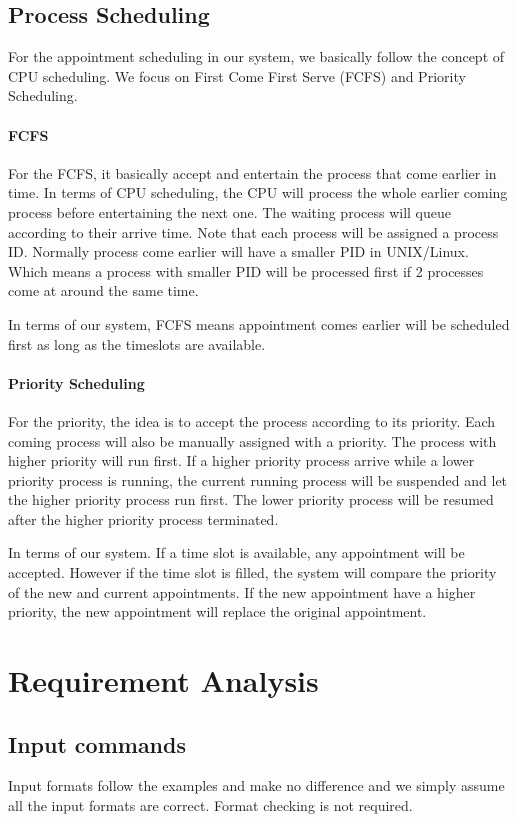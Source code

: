 \documentclass[12pt,a4paper]{report}
\begin{document}
\section{Process Scheduling}
For the appointment scheduling in our system, we basically follow the concept of CPU scheduling. We focus on First Come First Serve (FCFS) and Priority Scheduling.
\subsubsection{FCFS}
For the FCFS, it basically accept and entertain the process that come earlier in time. In terms of CPU scheduling, the CPU will process the whole earlier coming process before entertaining the next one. The waiting process will queue according to their arrive time. Note that each process will be assigned a process ID. Normally process come earlier will have a smaller PID in UNIX/Linux. Which means a process with smaller PID will be processed first if 2 processes come at around the same time.

In terms of our system, FCFS means appointment comes earlier will be scheduled first as long as the timeslots are available.
\subsubsection{Priority Scheduling}
For the priority, the idea is to accept the process according to its priority. Each coming process will also be manually assigned with a priority. The process with higher priority will run first. If a higher priority process arrive while a lower priority process is running, the current running process will be suspended and let the higher priority process run first. The lower priority process will be resumed after the higher priority process terminated.

In terms of our system. If a time slot is available, any appointment will be accepted. However if the time slot is filled, the system will compare the priority of the new and current appointments. If the new appointment have a higher priority, the new appointment will replace the original appointment.
\chapter{Requirement Analysis}
\section{Input commands}
Input formats follow the examples and make no difference and we simply assume all the input formats are correct.
Format checking is not required. 
\end{document}
